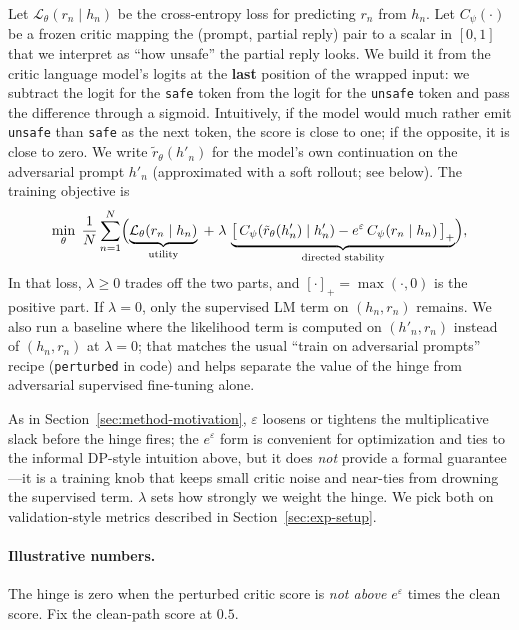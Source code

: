 \documentclass{article}
\begin{document}
Let $\mathcal{L}_\theta(r_n\mid h_n)$ be the cross-entropy loss for predicting $r_n$ from $h_n$. Let $C_\psi(\cdot)$ be a frozen critic mapping the (prompt, partial reply) pair to a scalar in $[0,1]$ that we interpret as ``how unsafe'' the partial reply looks. We build it from the critic language model's logits at the \textbf{last} position of the wrapped input: we subtract the logit for the \texttt{safe} token from the logit for the \texttt{unsafe} token and pass the difference through a sigmoid. Intuitively, if the model would much rather emit \texttt{unsafe} than \texttt{safe} as the next token, the score is close to one; if the opposite, it is close to zero. We write $\tilde{r}_\theta(h'_n)$ for the model's own continuation on the adversarial prompt $h'_n$ (approximated with a soft rollout; see below). The training objective is
\begin{equation}
\label{eq:loss}
\min_{\theta}\;\frac{1}{N}\sum_{n=1}^{N}\Bigl(
\underbrace{\mathcal{L}_\theta(r_n\mid h_n)}_{\text{utility}}
\;+\;\lambda\,
\underbrace{\bigl[\,C_\psi(\tilde{r}_\theta(h'_n)\mid h'_n)
- e^{\varepsilon}\,C_\psi(r_n\mid h_n)\,\bigr]_{+}}_{\text{directed stability}}
\Bigr),
\end{equation}
In that loss, $\lambda\ge0$ trades off the two parts, and $[\cdot]_+=\max(\cdot,0)$ is the positive part. If $\lambda{=}0$, only the supervised LM term on $(h_n,r_n)$ remains. We also run a baseline where the likelihood term is computed on $(h'_n,r_n)$ instead of $(h_n,r_n)$ at $\lambda{=}0$; that matches the usual ``train on adversarial prompts'' recipe (\texttt{perturbed} in code) and helps separate the value of the hinge from adversarial supervised fine-tuning alone.

As in Section~\ref{sec:method-motivation}, $\varepsilon$ loosens or tightens the multiplicative slack before the hinge fires; the $e^\varepsilon$ form is convenient for optimization and ties to the informal DP-style intuition above, but it does \emph{not} provide a formal guarantee---it is a training knob that keeps small critic noise and near-ties from drowning the supervised term. $\lambda$ sets how strongly we weight the hinge. We pick both on validation-style metrics described in Section~\ref{sec:exp-setup}.

\paragraph{Illustrative numbers.} The hinge is zero when the perturbed critic score is \emph{not above} $e^{\varepsilon}$ times the clean score. Fix the clean-path score at $0.5$.
\end{document}
